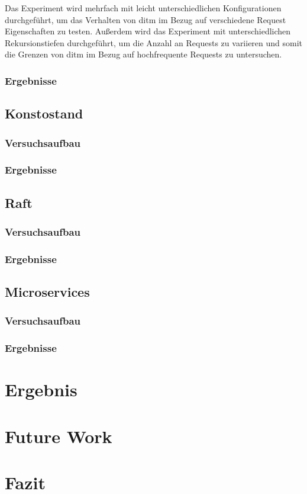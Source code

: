 \documentclass[a4paper]{report}
\begin{document}
Das Experiment wird mehrfach mit leicht unterschiedlichen Konfigurationen durchgeführt, um das Verhalten von ditm
im Bezug auf verschiedene Request Eigenschaften zu testen.
Außerdem wird das Experiment mit unterschiedlichen Rekursionstiefen durchgeführt, um die Anzahl an Requests zu
variieren und somit die Grenzen von ditm im Bezug auf hochfrequente Requests zu untersuchen.
\subsection{Ergebnisse}
\section{Konstostand}
\subsection{Versuchsaufbau}
\subsection{Ergebnisse}
\section{Raft}
\subsection{Versuchsaufbau}
\subsection{Ergebnisse}
\section{Microservices}
\subsection{Versuchsaufbau}
\subsection{Ergebnisse}

\chapter{Ergebnis}

\chapter{Future Work}

\chapter{Fazit}

\printbibliography
\end{document}
